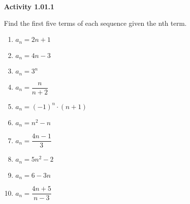 \vspace{0.3ex}
\noindent\textbf{Activity 1.01.1}

\vspace{0.2ex}

Find the first five terms of each sequence given the nth term.
\begin{multicols}{2}
\begin{enumerate}
    \item $a_n = 2n + 1$
    \item $a_n = 4n - 3$
    \item $a_n = 3^n$
    \item $a_n = \dfrac{n}{n+2}$
    \item $a_n = (-1)^n \cdot (n+1)$
    \item $a_n = n^2 - n$
    \item $a_n = \dfrac{4n-1}{3}$
    \item $a_n = 5n^2 - 2$
    \item $a_n = 6 - 3n$
    \item $a_n = \dfrac{4n+5}{n-3}$
    \end{enumerate}
    \end{multicols}
